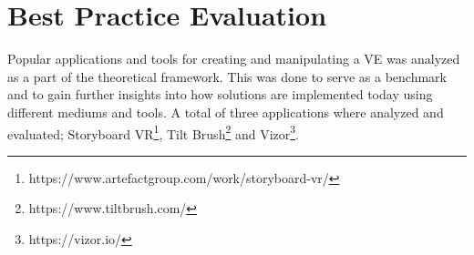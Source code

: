 \section{Best Practice Evaluation}
Popular applications and tools for creating and manipulating a VE was analyzed as a part of the theoretical framework. This was done to serve as a benchmark and to gain further insights into how solutions are implemented today using different mediums and tools. A total of three applications where analyzed and evaluated; Storyboard VR\footnote{https://www.artefactgroup.com/work/storyboard-vr/}, Tilt Brush\footnote{https://www.tiltbrush.com/} and Vizor\footnote{https://vizor.io/}.
